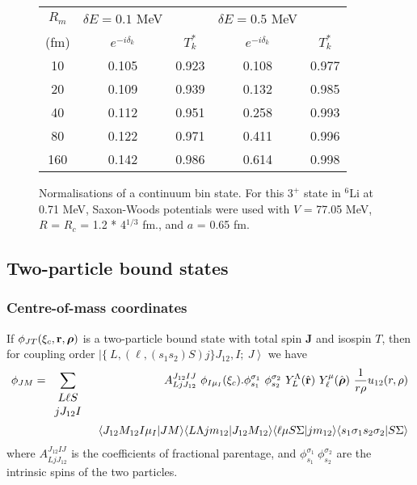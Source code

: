 \documentclass[11pt,a4paper]{article}
\newcommand{\vecr}{{\bf r}}
\newcommand{\brho}{{\mbox{\boldmath $\rho$}}}
\begin{document}
\begin{figure}
\label{bins}
\begin{tabular}{c|cccc}
$R_m$ & $\delta E = 0.1$ MeV &&$\delta E = 0.5$ MeV& \\
(fm)& $e^{-i \delta_k}$& $T_k^* $ & $e^{-i \delta_k}$ & $T_k^* $\\
\hline
10&0.105&0.923&0.108&0.977\\
20&0.109&0.939&0.132&0.985\\
40&0.112&0.951&0.258&0.993\\
80&0.122&0.971&0.411&0.996\\
160&0.142&0.986&0.614&0.998\\
\hline
\end{tabular}
\caption{Normalisations of a continuum bin state.
For this $ 3^+ $ state in $^6$Li at 0.71 MeV,
Saxon-Woods potentials were used with $V$ = 77.05 MeV,
$R$ = $R_c$ = 1.2 * 4$^{1/3}$ fm., and $a$ = 0.65 fm.}
\end{figure}
\subsection{Two-particle bound states}
\label{NNBS}
\subsubsection{Centre-of-mass coordinates}

If $\phi_{JT} (\xi_c , \vecr , {\brho} ) $ is a two-particle
bound state with total spin {\bf J} and isospin $T$, then for coupling order
$ \left | \{~L , (\ell , (s_1 s_2) S ) j \}
           J_{12} , I ;~J \right\rangle $
we have
\begin{eqnarray} \nonumber
  \phi_{J M} =
    \sum_{\begin{array} {ccc} L  \ell S\\j  J_{12} I\end{array}}
     && A_{L j J_{12}}^{J_{12} I J} ~
       \phi_{I \mu_I} (\xi_c)  .
       \phi_{s_1}^{\sigma_1} ~\phi_{s_2}^{\sigma_2} ~
        Y_{L}^{\Lambda} ( \hat\vecr ) ~
        Y_\ell^\mu (  \hat {\brho} ) ~
        {1 \over r \rho} u_{12} (r, \rho)
\\  \label{tntwf}
    &&\langle J_{12} M_{12}  I \mu_I | J M\rangle
       \langle L \Lambda j m_{12} | J_{12} M_{12}\rangle
       \langle \ell \mu S \Sigma         | j m_{12}\rangle
       \langle s_1 \sigma_1 s_2 \sigma_2  | S \Sigma\rangle
\end{eqnarray}
where
$ A_{L j J_{12}}^{J_{12} I J} $ is the coefficients of fractional parentage,
 and $\phi_{s_1}^{\sigma_1} ~\phi_{s_2}^{\sigma_2}$ are the
intrinsic spins of the two particles.
\end{document}
